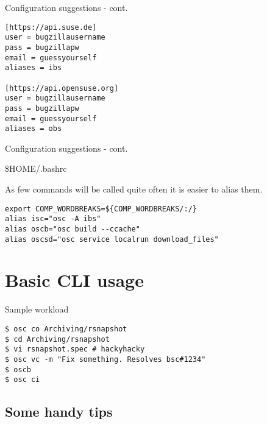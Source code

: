 \documentclass{beamer}
\begin{document}
\begin{frame}[fragile]{Configuration suggestions - cont.}
	\begin{small}
\begin{verbatim}
[https://api.suse.de]
user = bugzillausername
pass = bugzillapw
email = guessyourself
aliases = ibs

[https://api.opensuse.org]
user = bugzillausername
pass = bugzillapw
email = guessyourself
aliases = obs
\end{verbatim}
	\end{small}
\end{frame}

\begin{frame}[fragile]{Configuration suggestions - cont.}
	\begin{center}\$HOME/.bashrc\end{center}
	As few commands will be called quite often it is easier to alias them.
	\begin{small}
\begin{verbatim}
export COMP_WORDBREAKS=${COMP_WORDBREAKS/:/}
alias isc="osc -A ibs"
alias oscb="osc build --ccache"
alias oscsd="osc service localrun download_files"
\end{verbatim}
	\end{small}
\end{frame}

\section{Basic CLI usage}

\begin{frame}[fragile]{Sample workload}
	\begin{small}
\begin{verbatim}
$ osc co Archiving/rsnapshot
$ cd Archiving/rsnapshot
$ vi rsnapshot.spec # hackyhacky
$ osc vc -m "Fix something. Resolves bsc#1234"
$ oscb
$ osc ci
\end{verbatim}
	\end{small}
\end{frame}

\subsection{Some handy tips}
\end{document}
